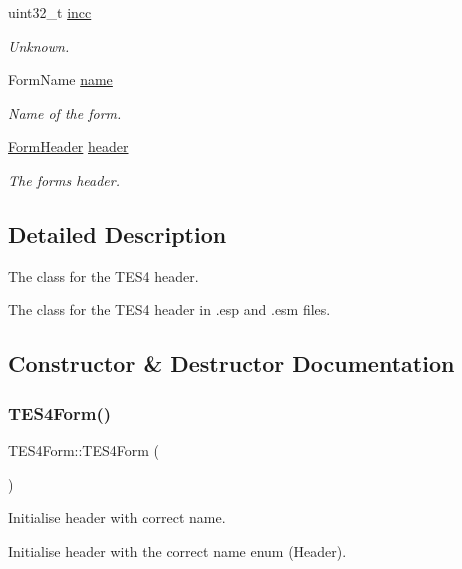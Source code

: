 \begin{DoxyCompactItemize}
uint32\+\_\+t \hyperlink{class_t_e_s4_form_a66402e4e8d8c7ada7380af8c4fd3518c}{incc}
\begin{DoxyCompactList}\small\item\em Unknown. \end{DoxyCompactList}\item 
Form\+Name \hyperlink{class_form_a3a19912be281bc3e9c99911bb70e0f4b}{name}
\begin{DoxyCompactList}\small\item\em Name of the form. \end{DoxyCompactList}\item 
\hyperlink{struct_form_header}{Form\+Header} \hyperlink{class_form_a6aec4c07386c72bb12947f7766562856}{header}
\begin{DoxyCompactList}\small\item\em The form\textquotesingle{}s header. \end{DoxyCompactList}\end{DoxyCompactItemize}


\subsection{Detailed Description}
The class for the T\+E\+S4 header. 

The class for the T\+E\+S4 header in .esp and .esm files. 

\subsection{Constructor \& Destructor Documentation}
\mbox{\label{class_t_e_s4_form_a5d6ded3ee737f8bef51b9ae6bfc77c37}} 
\subsubsection{\texorpdfstring{T\+E\+S4\+Form()}{TES4Form()}}
{\footnotesize\ttfamily T\+E\+S4\+Form\+::\+T\+E\+S4\+Form (\begin{DoxyParamCaption}{ }\end{DoxyParamCaption})}



Initialise header with correct name. 

Initialise header with the correct name enum (Header). \mbox{\label{class_t_e_s4_form_a634ebfa0b990061b23a158ab4192c140}} 
